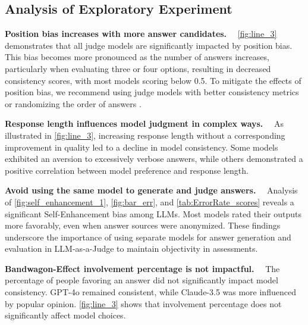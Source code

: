 \documentclass{article} %
\newcommand{\header}[1]{\noindent\textbf{{#1}}~~}
\begin{document}
\subsection{Analysis of Exploratory Experiment}
\vspace{-1em}
\header{Position bias increases with more answer candidates.}
\autoref{fig:line_3} demonstrates that all judge models are significantly impacted by position bias. This bias becomes more pronounced as the number of answers increases, particularly when evaluating three or four options, resulting in decreased consistency scores, with most models scoring below 0.5. To mitigate the effects of position bias, we recommend using judge models with better consistency metrics or randomizing the order of answers \citep{zheng2024judging, li2023splitmergealigningposition}.


\header{Response length influences model judgment in complex ways.}
As illustrated in \autoref{fig:line_3}, increasing response length without a corresponding improvement in quality led to a decline in model consistency. Some models exhibited an aversion to excessively verbose answers, while others demonstrated a positive correlation between model preference and response length. %


\header{Avoid using the same model to generate and judge answers.}
Analysis of \autoref{fig:self_enhancement_1}, \autoref{fig:bar_err}, and \autoref{tab:ErrorRate_scores} reveals a significant Self-Enhancement bias among LLMs. Most models rated their outputs more favorably, even when answer sources were anonymized. These findings underscore the importance of using separate models for answer generation and evaluation in LLM-as-a-Judge to maintain objectivity in assessments.

\header{Bandwagon-Effect involvement percentage is not impactful.}
The percentage of people favoring an answer did not significantly impact model consistency. GPT-4o remained consistent, while Claude-3.5 was more influenced by popular opinion. \autoref{fig:line_3} shows that involvement percentage does not significantly affect model choices.
\end{document}
